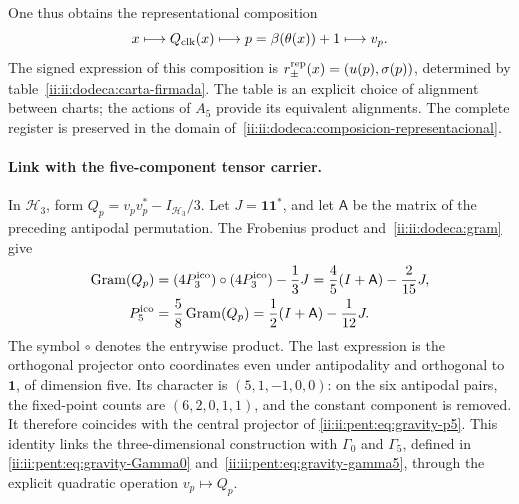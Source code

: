 One thus obtains the representational composition
\begin{equation}
 x\longmapsto Q_{\rm clk}(x)\longmapsto
 p=\beta(\theta(x))+1\longmapsto v_p.
 \label{ii:ii:dodeca:composicion-representacional}
\end{equation}
The signed expression of this composition is
\(r_\pm^{\rm rep}(x)=(u(p),\sigma(p))\), determined by
table~\eqref{ii:ii:dodeca:carta-firmada}. The table is an explicit choice
of alignment between charts; the actions of \(A_5\) provide its
equivalent alignments. The complete register is preserved in the
domain of~\eqref{ii:ii:dodeca:composicion-representacional}.

\paragraph{Link with the five-component tensor carrier.}
In \(\mathcal H_3\), form
\(Q_p=v_pv_p^*-I_{\mathcal H_3}/3\). Let \(J=\mathbf1\mathbf1^*\),
and let \(\mathsf A\) be the matrix of the preceding antipodal permutation.
The Frobenius product and~\eqref{ii:ii:dodeca:gram} give
\begin{equation}
 \begin{aligned}
 \operatorname{Gram}(Q_p)
 &=(4P_3^{\mathrm{ico}})\circ(4P_3^{\mathrm{ico}})-\frac13J
 =\frac45(I+\mathsf A)-\frac2{15}J,
 \\
 P^{\rm ico}_5&=\frac58\operatorname{Gram}(Q_p)
 =\frac12(I+\mathsf A)-\frac1{12}J.
 \end{aligned}
 \label{ii:ii:dodeca:puente-tensorial}
\end{equation}
The symbol \(\circ\) denotes the entrywise product. The last
expression is the orthogonal projector onto coordinates even under
antipodality and orthogonal to \(\mathbf1\), of dimension five. Its character
is \((5,1,-1,0,0)\): on the six antipodal pairs, the fixed-point
counts are \((6,2,0,1,1)\), and the constant component is removed.
It therefore coincides with the central projector of
\eqref{ii:ii:pent:eq:gravity-p5}. This identity links the three-dimensional
construction with \(\Gamma_0\) and \(\Gamma_5\), defined in
\eqref{ii:ii:pent:eq:gravity-Gamma0} and~\eqref{ii:ii:pent:eq:gravity-gamma5},
through the explicit quadratic operation \(v_p\mapsto Q_p\).

